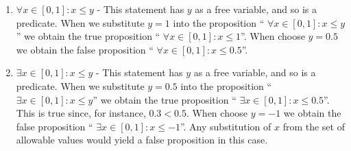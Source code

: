 \begin{solutions}
\begin{enumerate}
		\item $\forall x \in [0,1]:  x \leq y$ - This statement has $y$ as a free variable, and so is a predicate.  When we substitute $y=1$ into the proposition `` $\forall x \in [0,1]:  x \leq y$'' we obtain the true proposition `` $\forall x \in [0,1]:  x \leq 1$''.  When choose  $y = 0.5$ we obtain the false proposition `` $\forall x \in [0,1]:  x \leq 0.5$''. 
		\item $\exists x \in [0,1]: x \leq y$  - This statement has $y$ as a free variable, and so is a predicate.  When we substitute $y=0.5$ into the proposition `` $\exists x \in [0,1]:  x \leq y$'' we obtain the true proposition `` $\exists x \in [0,1]:  x \leq 0.5$''. This is true since, for instance, $0.3 < 0.5$.  When choose  $y = -1$ we obtain the false proposition `` $\exists x \in [0,1]:  x \leq -1$''.  Any substitution of $x$ from the set of allowable values would yield a false proposition in this case. 
	\end{enumerate}
	\end{solutions}

